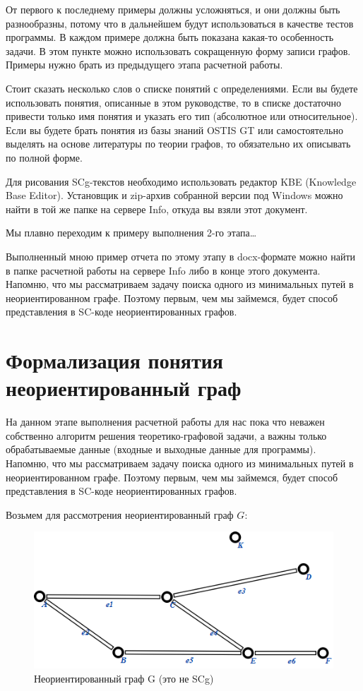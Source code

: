 От первого к последнему примеры должны усложняться, и они должны быть
разнообразны, потому что в дальнейшем будут использоваться в качестве
тестов программы. В каждом примере должна быть показана какая-то
особенность задачи. В этом пункте можно использовать сокращенную форму
записи графов. Примеры нужно брать из предыдущего этапа расчетной
работы.

Стоит сказать несколько слов о списке понятий с определениями. Если вы
будете использовать понятия, описанные в этом руководстве, то в списке
достаточно привести только имя понятия и указать его тип (абсолютное
или относительное). Если вы будете брать понятия из базы знаний OSTIS
GT или самостоятельно выделять на основе литературы по теории графов,
то обязательно их описывать по полной форме.

Для рисования SCg-текстов необходимо использовать редактор KBE
(Knowledge Base Editor). Установщик и zip-архив собранной версии под
Windows можно найти в той же папке на сервере Info, откуда вы взяли
этот документ.

Мы плавно переходим к примеру выполнения 2-го этапа…

Выполненный мною пример отчета по этому этапу в docx-формате можно
найти в папке расчетной работы на сервере Info либо в конце этого
документа.  Напомню, что мы рассматриваем задачу поиска одного из
минимальных путей в неориентированном графе. Поэтому первым, чем мы
займемся, будет способ представления в SC-коде неориентированных
графов.


\section{Формализация понятия неориентированный граф}

На данном этапе выполнения расчетной работы для нас пока что неважен
собственно алгоритм решения теоретико-графовой задачи, а важны только
обрабатываемые данные (входные и выходные данные для
программы). Напомню, что мы рассматриваем задачу поиска одного из
минимальных путей в неориентированном графе. Поэтому первым, чем мы
займемся, будет способ представления в SC-коде неориентированных
графов.  

Возьмем для рассмотрения неориентированный граф $G$:

\begin{figure}[h]
  \centering
  \includegraphics[scale=0.7]{images/2/Undirected_graph_not_scg}
  \caption{Неориентированный граф G (это не SCg)}
  \label{fig:Undirected_graph_not_scg}
\end{figure}

